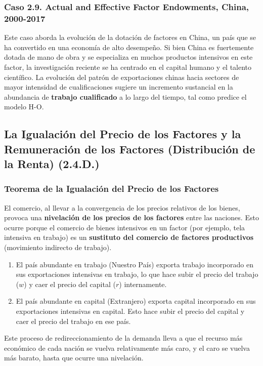 \subsubsection{Caso 2.9. Actual and Effective Factor Endowments, China, 2000-2017}
Este caso aborda la evolución de la dotación de factores en China, un país que se ha convertido en una economía de alto desempeño. Si bien China es fuertemente dotada de mano de obra y se especializa en muchos productos intensivos en este factor, la investigación reciente se ha centrado en el capital humano y el talento científico. La evolución del patrón de exportaciones chinas hacia sectores de mayor intensidad de cualificaciones sugiere un incremento sustancial en la abundancia de \textbf{trabajo cualificado} a lo largo del tiempo, tal como predice el modelo H-O.

\subsection{La Igualación del Precio de los Factores y la Remuneración de los Factores (Distribución de la Renta) (2.4.D.)}

\subsubsection{Teorema de la Igualación del Precio de los Factores}
El comercio, al llevar a la convergencia de los precios relativos de los bienes, provoca una \textbf{nivelación de los precios de los factores} entre las naciones. Esto ocurre porque el comercio de bienes intensivos en un factor (por ejemplo, tela intensiva en trabajo) es un \textbf{sustituto del comercio de factores productivos} (movimiento indirecto de trabajo).

\begin{enumerate}
    \item El país abundante en trabajo (Nuestro País) exporta trabajo incorporado en sus exportaciones intensivas en trabajo, lo que hace subir el precio del trabajo ($w$) y caer el precio del capital ($r$) internamente.
    \item El país abundante en capital (Extranjero) exporta capital incorporado en sus exportaciones intensivas en capital. Esto hace subir el precio del capital y caer el precio del trabajo en ese país.
\end{enumerate}
Este proceso de redireccionamiento de la demanda lleva a que el recurso más económico de cada nación se vuelva relativamente más caro, y el caro se vuelva más barato, hasta que ocurre una nivelación.

